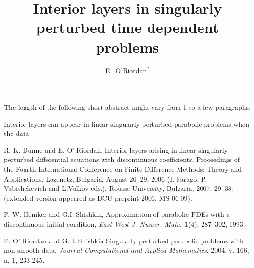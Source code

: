 \documentclass{layers17}
\begin{document}



\title{Interior layers in singularly perturbed time dependent problems }



\author{E.\ O'Riordan$^*$}



\address{$^*$\
School of Mathematical Sciences,
Dublin City University,
address.\\
E-mail:eugene.oriordan@dcu.ie,
\
}


\received{} \revised{} \noaccepted{}


%
The length of the following short abstract might vary from 1 to a few paragraphs.

\begin{shortabstract}


Interior layers can appear in linear singularly perturbed parabolic problems when the data


\end{shortabstract}










\begin{thebibliography}{9}



 R. K. Dunne and E. O' Riordan, Interior layers arising in linear singularly  perturbed differential equations with discontinuous coefficients,  Proceedings of the Fourth International Conference on Finite Difference Methods: Theory and Applications, Lozenetz, Bulgaria, August 26--29, 2006 (I. Farago, P. Vabishchevich and L.Vulkov eds.), Rousse University, Bulgaria, 2007,  29--38. (extended version appeared as DCU preprint 2006, MS-06-09).


 P. W. Hemker and G.I. Shishkin,
Approximation of parabolic PDEs with a discontinuous initial condition,
{\em East-West J. Numer. Math}, {\bf 1}(4), 287--302, 1993.



 E. O' Riordan and G. I. Shishkin Singularly perturbed
parabolic problems with non-smooth data,  {\em Journal Computational and Applied Mathematics}, 2004, v. 166, n. 1, 233-245.


\end{thebibliography}


\end{document}
